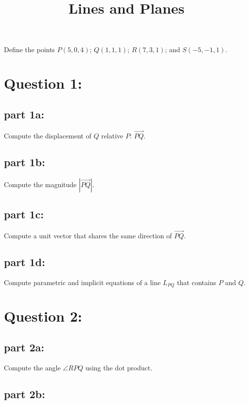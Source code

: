 \documentclass{article}
\title{Lines and Planes}
\date{}
\newcommand{\abs}[1]{\left|#1\right|}
\newcommand{\pvec}[1]{\overrightarrow{#1}}
\begin{document}
\maketitle

Define the points \(P(5,0,4)\); \(Q(1,1,1)\); \(R(7,3,1)\); and \(S(-5,-1,1)\). 

\section*{Question 1:}

\subsection*{part 1a:}

Compute the displacement of \(Q\) relative \(P\): \(\pvec{PQ}\).

\subsection*{part 1b:}

Compute the magnitude \(\abs{\pvec{PQ}}\).

\subsection*{part 1c:}

Compute a unit vector that shares the same direction of \(\pvec{PQ}\).

\subsection*{part 1d:}

Compute parametric and implicit equations of a line \(L_{PQ}\) that contains \(P\) and \(Q\).



\section*{Question 2:}

\subsection*{part 2a:}

Compute the angle \(\angle RPQ\) using the dot product. 

\subsection*{part 2b:}
\end{document}
